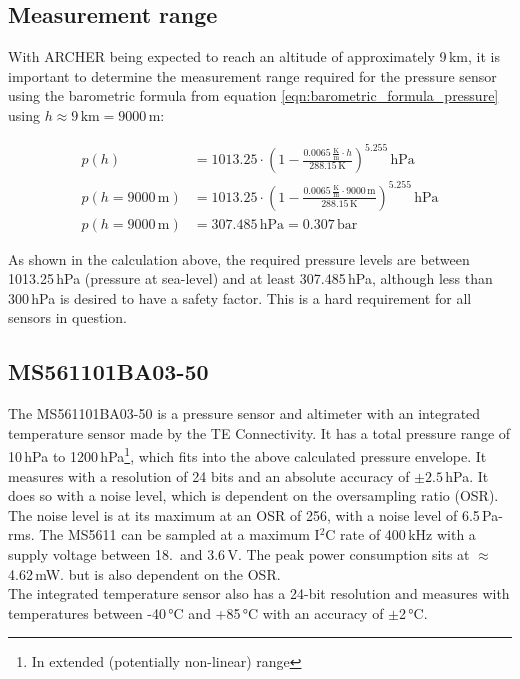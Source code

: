 \documentclass[fontsize=11pt,%
twoside,%
BCOR          = 8mm, %
DIV           = 11,  %
titlepage     = off,%
index=totoc,%
xcolor        = pdftex,%
dvipsnames,%
bibliography  = totoc,%
bibliography = numbered, %
listof        = notnumbered]{scrreprt}
\begin{document}
\subsection{Measurement range}
With ARCHER being expected to reach an altitude of approximately 9\,km, it is important to determine the measurement range required for the pressure sensor using the barometric formula from equation \ref{eqn:barometric_formula_pressure} using $h \approx 9\,\text{km} = 9000\,\text{m}$:

\begin{align*}
	p(h) &= 1013.25\cdot \left(1 - \frac{0.0065\,\frac{\text{K}}{\text{m}}\cdot h}{288.15\,\text{K}}\right)^{5.255}\,\text{hPa}\\
	p(h=9000\,\text{m})&= 1013.25\cdot \left(1 - \frac{0.0065\,\frac{\text{K}}{\text{m}}\cdot 9000\,\text{m}}{288.15\,\text{K}}\right)^{5.255}\,\text{hPa}\\
	p(h=9000\,\text{m})&= 307.485\,\text{hPa} = 0.307\,\text{bar}	
\end{align*}

As shown in the calculation above, the required pressure levels are between 1013.25\,hPa (pressure at sea-level) and at least 307.485\,hPa, although less than 300\,hPa is desired to have a safety factor. This is a hard requirement for all sensors in question.

\subsection{MS561101BA03-50}
The MS561101BA03-50 is a pressure sensor and altimeter with an integrated temperature sensor made by the  TE Connectivity. It has a total pressure range of 10\,hPa to 1200\,hPa\footnote{In extended (potentially non-linear) range}, which fits into the above calculated pressure envelope. It measures with a resolution of 24 bits and an absolute accuracy of $\pm2.5\,$hPa. It does so with a noise level, which is dependent on the oversampling ratio (OSR). The noise level is at its maximum at an OSR of 256, with a noise level of 6.5\,Pa-rms. The MS5611 can be sampled at a maximum I$^2$C rate of 400\,kHz with a supply voltage between 18.\, and 3.6\,V. The peak power consumption sits at $\approx$4.62\,mW. but is also dependent on the OSR.\\
The integrated temperature sensor also has a 24-bit resolution and measures with temperatures between -40\,°C and +85\,°C with an accuracy of $\pm$2\,°C.
\end{document}

